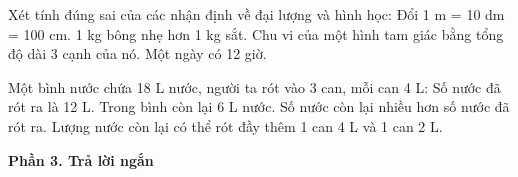 \begin{ex} %
Xét tính đúng sai của các nhận định về đại lượng và hình học:
\choiceTF
{\True Đổi 1 m = 10 dm = 100 cm.}
{1 kg bông nhẹ hơn 1 kg sắt.}
{\True Chu vi của một hình tam giác bằng tổng độ dài 3 cạnh của nó.}
{Một ngày có 12 giờ.}
\end{ex}

\begin{ex} %
Một bình nước chứa 18 L nước, người ta rót vào 3 can, mỗi can 4 L:
\choiceTF
{\True Số nước đã rót ra là 12 L.}
{\True Trong bình còn lại 6 L nước.}
{Số nước còn lại nhiều hơn số nước đã rót ra.}
{\True Lượng nước còn lại có thể rót đầy thêm 1 can 4 L và 1 can 2 L.}
\end{ex}

\textbf{Phần 3. Trả lời ngắn}

